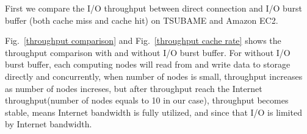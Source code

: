 	


First we compare the I/O throughput between direct connection and I/O burst buffer (both cache miss and cache hit) on TSUBAME and Amazon EC2.

Fig.~\ref{throughput comparison} and Fig.~\ref{throughput cache rate} shows the throughput comparison with and without I/O burst buffer.
For without I/O burst buffer, each computing nodes will read from and write data to storage directly and concurrently, when number of nodes is small, throughput increases as number of nodes increses, but after throughput reach the Internet throughput(number of nodes equals to 10 in our case), throughput becomes stable, means Internet bandwidth is fully utilized, and since that I/O is limited by Internet bandwidth.

